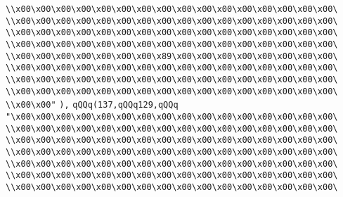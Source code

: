 \verb|\\x00\x00\x00\x00\x00\x00\x00\x00\x00\x00\x00\x00\x00\x00\x00\x00\|\newline
\verb|\\x00\x00\x00\x00\x00\x00\x00\x00\x00\x00\x00\x00\x00\x00\x00\x00\|\newline
\verb|\\x00\x00\x00\x00\x00\x00\x00\x00\x00\x00\x00\x00\x00\x00\x00\x00\|\newline
\verb|\\x00\x00\x00\x00\x00\x00\x00\x00\x00\x00\x00\x00\x00\x00\x00\x00\|\newline
\verb|\\x00\x00\x00\x00\x00\x00\x00\x89\x00\x00\x00\x00\x00\x00\x00\x00\|\newline
\verb|\\x00\x00\x00\x00\x00\x00\x00\x00\x00\x00\x00\x00\x00\x00\x00\x00\|\newline
\verb|\\x00\x00\x00\x00\x00\x00\x00\x00\x00\x00\x00\x00\x00\x00\x00\x00\|\newline
\verb|\\x00\x00\x00\x00\x00\x00\x00\x00\x00\x00\x00\x00\x00\x00\x00\x00\|\newline
\verb|\\x00\x00"|\newline
\verb|),|\newline
\verb|qQQq(137,qQQq129,qQQq|\newline
\verb|"\x00\x00\x00\x00\x00\x00\x00\x00\x00\x00\x00\x00\x00\x00\x00\x00\|\newline
\verb|\\x00\x00\x00\x00\x00\x00\x00\x00\x00\x00\x00\x00\x00\x00\x00\x00\|\newline
\verb|\\x00\x00\x00\x00\x00\x00\x00\x00\x00\x00\x00\x00\x00\x00\x00\x00\|\newline
\verb|\\x00\x00\x00\x00\x00\x00\x00\x00\x00\x00\x00\x00\x00\x00\x00\x00\|\newline
\verb|\\x00\x00\x00\x00\x00\x00\x00\x00\x00\x00\x00\x00\x00\x00\x00\x00\|\newline
\verb|\\x00\x00\x00\x00\x00\x00\x00\x00\x00\x00\x00\x00\x00\x00\x00\x00\|\newline
\verb|\\x00\x00\x00\x00\x00\x00\x00\x00\x00\x00\x00\x00\x00\x00\x00\x00\|\newline

